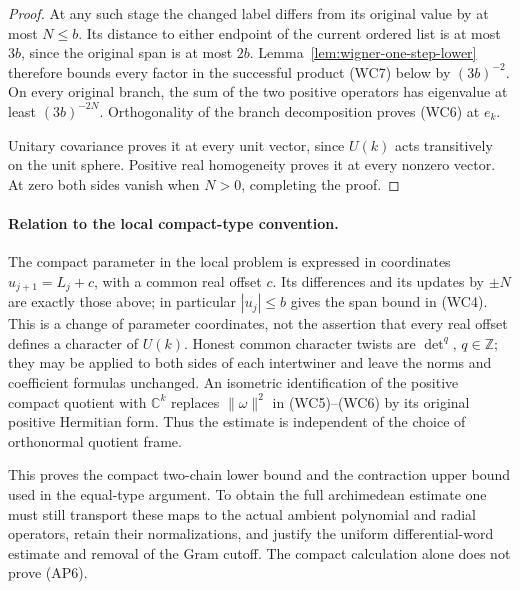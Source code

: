 \begin{proof}
At any such stage the changed label differs from its original
value by at most \(N\le b\). Its distance to either endpoint
of the current ordered list is at most \(3b\), since the
original span is at most \(2b\). Lemma~\ref{lem:wigner-one-step-lower}
therefore bounds every factor in the successful product (WC7)
below by \((3b)^{-2}\). On every original branch, the sum of the
two positive operators has eigenvalue at least \((3b)^{-2N}\).
Orthogonality of the branch decomposition proves (WC6) at \(e_k\).

Unitary covariance proves it at every unit vector, since \(U(k)\)
acts transitively on the unit sphere. Positive real homogeneity
proves it at every nonzero vector. At zero both sides vanish
when \(N>0\), completing the proof.
\end{proof}

\paragraph{Relation to the local compact-type convention.}
The compact parameter in the local problem is expressed in coordinates
\(u_{j+1}=L_j+c\), with a common real offset \(c\).
Its differences and its updates by \(\pm N\) are exactly those above;
in particular \(|u_j|\le b\) gives the span bound in (WC4).
This is a change of parameter coordinates, not the assertion that
every real offset defines a character of \(U(k)\). Honest common
character twists are \(\det^q\), \(q\in\mathbb Z\); they may be
applied to both sides of each intertwiner and leave the norms and
coefficient formulas unchanged.
An isometric identification of the positive compact quotient with
\(\mathbb C^k\) replaces \(\|\omega\|^2\) in (WC5)--(WC6) by
its original positive Hermitian form. Thus the estimate is
independent of the choice of orthonormal quotient frame.

This proves the compact two-chain lower bound and the contraction
upper bound used in the equal-type argument. To obtain the full
archimedean estimate one must still transport these maps to the
actual ambient polynomial and radial operators, retain their
normalizations, and justify the uniform differential-word estimate
and removal of the Gram cutoff. The compact calculation alone
does not prove (AP6).

